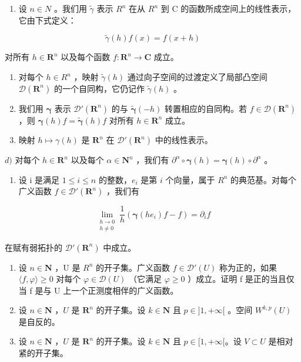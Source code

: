 \begin{enumerate}
\def\labelenumi{\arabic{enumi})}
\setcounter{enumi}{6}
\tightlist
\item
  设 \(n \in N\) 。我们用 \(\widetilde{\gamma}\) 表示 \(R^{n}\) 在从 \(R^{n}\) 到 C 的函数所成空间上的线性表示，它由下式定义：
\end{enumerate}

\[
\widetilde {\gamma} (h) f (x) = f (x + h)
\]

对所有 \(h \in \mathbf{R}^n\) 以及每个函数 \(f: \mathbf{R}^n \to \mathbf{C}\) 成立。

\begin{enumerate}
\def\labelenumi{\alph{enumi})}
\item
  对每个 \(h \in R^{n}\) ，映射 \(\widetilde{\gamma}(h)\) 通过向子空间的过渡定义了局部凸空间 \(\mathcal{D}(\mathbf{R}^{n})\) 的一个自同构，它仍记作 \(\widetilde{\gamma}(h)\) 。
\item
  我们用 \(\pmb{\gamma}\) 表示 \(\mathcal{D}'(\mathbf{R}^n)\) 的与 \(\widetilde{\pmb{\gamma}}(-h)\) 转置相应的自同构。若 \(f \in \mathcal{D}(\mathbf{R}^n)\) ，则 \(\pmb{\gamma}(h)f = \widetilde{\pmb{\gamma}}(h)f\) 对所有 \(h \in \mathbf{R}^n\) 成立。
\item
  映射 \(h \mapsto \gamma(h)\) 是 \(\mathbf{R}^{n}\) 在 \(\mathcal{D}'(\mathbf{R}^{n})\) 中的线性表示。
\end{enumerate}

\(d)\) 对每个 \(h \in \mathbf{R}^n\) 以及每个 \(\alpha \in \mathbf{N}^n\) ，我们有 \(\partial^\alpha \circ \boldsymbol{\gamma}(h) = \boldsymbol{\gamma}(h) \circ \partial^\alpha\) 。

\begin{enumerate}
\def\labelenumi{\alph{enumi})}
\setcounter{enumi}{4}
\tightlist
\item
  设 i 是满足 \(1 \leqslant i \leqslant n\) 的整数，\(e_{i}\) 是第 \(i\) 个向量，属于 \(R^{n}\) 的典范基。对每个广义函数 \(f \in \mathcal{D}'(\mathbf{R}^{n})\) ，我们有
\end{enumerate}

\[
\lim_{\substack{h\to 0\\ h\neq 0}}\frac{1}{h} (\boldsymbol {\gamma}(he_{i})f - f) = \partial_{i}f
\]

在赋有弱拓扑的 \(\mathcal{D}'(\mathbf{R}^n)\) 中成立。

\begin{enumerate}
\def\labelenumi{\arabic{enumi})}
\setcounter{enumi}{7}
\item
  设 \(n \in \mathbf{N}\) ，U 是 \(R^{n}\) 的开子集。广义函数 \(f \in \mathcal{D}'(U)\) 称为正的，如果 \(\langle f, \varphi \rangle \geqslant 0\) 对每个 \(\varphi \in \mathcal{D}(U)\) （它满足 \(\varphi \geqslant 0\) ）成立。证明 f 是正的当且仅当 f 是与 U 上一个正测度相伴的广义函数。
\item
  设 \(n \in \mathbf{N}\) ，\(U\) 是 \(\mathbf{R}^n\) 的开子集。设 \(k \in \mathbf{N}\) 且 \(p \in ]1, +\infty[\) 。空间 \(W^{k,p}(U)\) 是自反的。
\item
  设 \(n \in \mathbf{N}\) ，\(U\) 是 \(\mathbf{R}^n\) 的开子集。设 \(k \in \mathbf{N}\) 且 \(p \in [1, +\infty[\)。设 \(V \subset U\) 是相对紧的开子集。
\end{enumerate}

